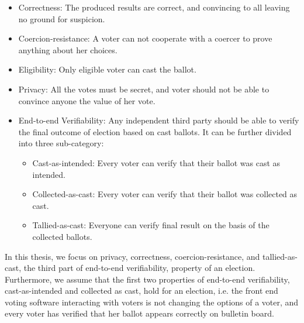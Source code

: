  \begin{itemize}
 
  \item Correctness:
 	The produced results are correct, and convincing to all leaving no  ground for suspicion. 

 \item Coercion-resistance: A voter can not cooperate with a coercer to prove anything about her choices.
 
 \item Eligibility: Only eligible voter can cast the ballot.
 	
 \item Privacy:
    All the votes must be secret, and voter should not be able to convince anyone the 
    value of her vote.
 
 \item End-to-end Verifiability:
 Any independent third party should be able to verify the final outcome of election based on cast 
 ballots.  It can be further divided into three sub-category:
 
 \begin{itemize}
  \item Cast-as-intended: Every voter can verify that their ballot was cast as
  intended.
  \item Collected-as-cast: Every voter can verify that their ballot was collected as
  cast.
  \item Tallied-as-cast: Everyone can verify final result on the basis of the
  collected ballots.
\end{itemize}
\end{itemize}
	

In this thesis, we focus on privacy, correctness, coercion-resistance, and tallied-as-cast, the third part of end-to-end verifiability, property 
of an election. Furthermore, we assume that the first two properties of end-to-end verifiability, cast-as-intended and 
collected as cast, hold for an election, i.e. the front end voting software interacting with voters is not 
changing the options of a voter, and every voter has verified that her ballot appears correctly on bulletin board. 

